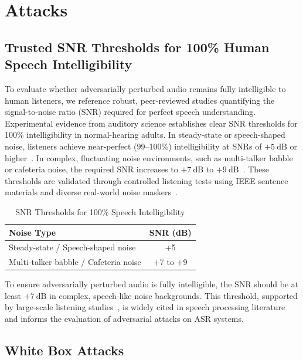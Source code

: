 \documentclass[../main.tex]{subfiles}
\begin{document}
\section{Attacks}

\subsection{Trusted SNR Thresholds for 100\% Human Speech Intelligibility}
\label{Trusted_SNR}

To evaluate whether adversarially perturbed audio remains fully intelligible to human listeners, we reference robust, peer-reviewed studies quantifying the signal-to-noise ratio (SNR) required for perfect speech understanding. Experimental evidence from auditory science establishes clear SNR thresholds for 100\% intelligibility in normal-hearing adults. In steady-state or speech-shaped noise, listeners achieve near-perfect (99--100\%) intelligibility at SNRs of $+5~\mathrm{dB}$ or higher~\cite{MaLoizou2011}. In complex, fluctuating noise environments, such as multi-talker babble or cafeteria noise, the required SNR increases to $+7~\mathrm{dB}$ to $+9~\mathrm{dB}$~\cite{MaLoizou2011}. These thresholds are validated through controlled listening tests using IEEE sentence materials and diverse real-world noise maskers~\cite{MaLoizou2011}.

\begin{table}[ht]
\centering
\footnotesize
\caption{SNR Thresholds for 100\% Speech Intelligibility}
\label{tab:snr_thresholds}
\begin{tabular}{@{\hspace{0.3cm}}lS[table-format=+2.0]@{\hspace{0.3cm}}}
\toprule
\textbf{Noise Type} & {\textbf{SNR (dB)}} \\
\midrule
Steady-state / Speech-shaped noise & +5 \\
Multi-talker babble / Cafeteria noise & {+7 to +9} \\
\bottomrule
\end{tabular}
\end{table}

To ensure adversarially perturbed audio is fully intelligible, the SNR should be at least $+7~\mathrm{dB}$ in complex, speech-like noise backgrounds. This threshold, supported by large-scale listening studies~\cite{MaLoizou2011}, is widely cited in speech processing literature and informs the evaluation of adversarial attacks on ASR systems.
\subsection{White Box Attacks}
\end{document}
